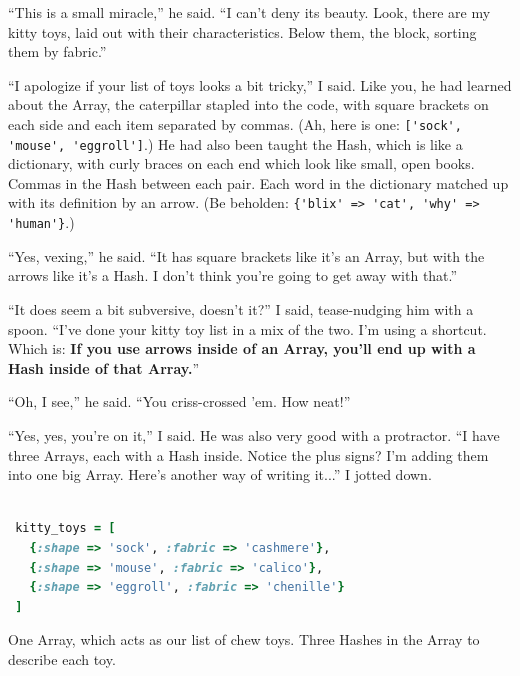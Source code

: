 \documentclass[10pt,twoside]{report}
\begin{document}
``This is a small miracle,'' he said. ``I can't deny its beauty.
Look, there are my kitty toys, laid out with their characteristics.
Below them, the block, sorting them by fabric.''

``I apologize if your list of toys looks a bit tricky,'' I said.  Like
you, he had learned about the Array, the caterpillar stapled into the
code, with square brackets on each side and each item separated by
commas.  (Ah, here is one: 
\lstinline[breaklines=true]|['sock', 'mouse', 'eggroll']|.) 
He had also been taught the Hash, which is like a dictionary, with
curly braces on each end which look like small, open books.  Commas in
the Hash between each pair.  Each word in the dictionary matched up
with its definition by an arrow.  (Be beholden:
\lstinline[breaklines=true]|{'blix' => 'cat', 'why' => 'human'}|.)

``Yes, vexing,'' he said.  ``It has square brackets like it's an
Array, but with the arrows like it's a Hash. I don't think you're
going to get away with that.''

``It does seem a bit subversive, doesn't it?''  I said, tease-nudging
him with a spoon.  ``I've done your kitty toy list in a mix of the
two.  I'm using a shortcut.  Which is: {\bf If you use arrows inside
  of an Array, you'll end up with a Hash inside of that Array.}''

``Oh, I see,'' he said.  ``You criss-crossed 'em.  How neat!''

``Yes, yes, you're on it,'' I said.  He was also very good with a
protractor.  ``I have three Arrays, each with a Hash inside.  Notice
the plus signs?  I'm adding them into one big Array.  Here's another
way of writing it...''  I jotted down.


\begin{lstlisting}[basicstyle=\ttfamily\color{basiccolor},
    commentstyle = \ttfamily\color{commentcolor},
    keywordstyle=\ttfamily\color{keywordscolor},
    stringstyle=\color{stringcolor},
    language=Ruby,
    basicstyle=\small\ttfamily,
    showstringspaces=false,
  ]

 kitty_toys = [
   {:shape => 'sock', :fabric => 'cashmere'},
   {:shape => 'mouse', :fabric => 'calico'},
   {:shape => 'eggroll', :fabric => 'chenille'}
 ]

\end{lstlisting}


One Array, which acts as our list of chew toys.  Three Hashes in the
Array to describe each toy.
\end{document}
